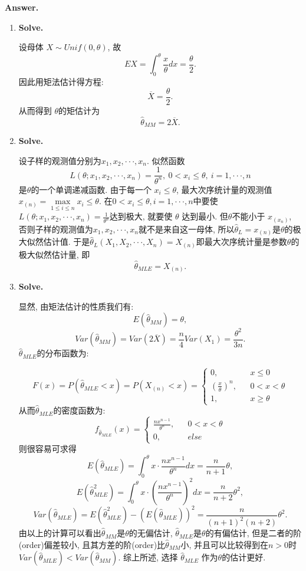 \documentclass[12pt, a4paper, oneside]{ctexart}
\newenvironment{solution}{\par\noindent \textbf {Answer. }}{\par}
\begin{document}
\begin{solution}	
   	\begin{enumerate}
   	\item {\tt}    {\bf Solve.} 
  
   设母体 $X  \sim Unif(0,\theta)$, 故
   \[ EX = \int_0^\theta \frac{x} {\theta}dx = \frac{\theta}{2} . \]
   因此用矩法估计得方程:\[ \overline{X}=\frac{\theta}{2} .\]
   从而得到 $\theta$的矩估计为\[ \hat{\theta}_{MM} = 2\overline{X}.\]
   	\item {\tt }   {\bf Solve.}
   
   	设子样的观测值分别为$x_1, x_2, · · · , x_n$. 似然函数\[ L(\theta;x_1, x_2,···,x_n) = \frac{1}{\theta ^ n}, \ 0 < x_i \le \theta ,\ i = 1,···,n\]是$\theta$的一个单调递减函数. 由于每一个 $x_i \le \theta$, 最大次序统计量的观测值$x_{(n)}=\underset{1\le i\le n}{\max}x_i \le \theta$. 在$0<x_i\le \theta , i = 1,···,n$中要使 $L(\theta;x_1, x_2,···,x_n)= \frac{1}{\theta ^ n}$达到极大, 就要使 $\theta$ 达到最小. 但$\theta$不能小于 $x_{(x_n)}$, 否则子样的观测值为$x_1, x_2, · · · , x_n$就不是来自这一母体, 所以$\hat{\theta}_L = x_{(n)}$是$\theta$的极大似然估计值. 于是$\hat{\theta}_L(X_1,X_2,···,X_n) = X_{(n)}$即最大次序统计量是参数$\theta$的极大似然估计量, 即\[ \hat{\theta}_{MLE}= X_{(n)}.\]
   	
   	\item {\tt }   {\bf Solve.}
   
   	显然, 由矩法估计的性质我们有:
   	\[ E(\hat{\theta}_{MM}) = \theta ,\] \[ Var(\hat{\theta}_{MM}) = Var(2\overline X) = \frac n 4Var(X_1) = \frac{\theta^2}{3n}. \]
   	$\hat{\theta}_{MLE}$的分布函数为:
   	
   $$ F(x) = P(\hat{\theta}_{MLE} < x)=P(X_{(n)} < x)=\left\{
   \begin{array}{rcl}
    0, & & {x \le 0}\\
   (\frac x \theta )^n, & & {0<x<\theta}\\
   1, & & {x\ge \theta}
   \end{array} \right. $$
   从而$\hat{\theta}_{MLE}$的密度函数为:
  $$ f_{\hat{\theta}_{MLE}}(x) =\left\{
  \begin{array}{rcl}
  \frac{nx^{n-1}}{\theta^n}, & & {0<x<\theta}\\
  0, & & {else}
  \end{array} \right. $$
   则很容易可求得\[ E(\hat{\theta}_{MLE}) = \int_0^\theta x·\frac{nx^{n-1}}{\theta^n} dx = \frac{n}{n+1}\theta ,\]
   \[ E(\hat{\theta}_{MLE}^2) = \int_0^\theta x·\left(\frac{nx^{n-1}}{\theta^n}\right)^2 dx = \frac{n}{n+2}\theta^2,\]
   \[ Var(\hat{\theta}_{MLE}) =   E(\hat{\theta}_{MLE}^2) - \left(E(\hat{\theta}_{MLE}) \right)^2 = \frac{n}{(n+1)^2(n+2)}\theta^2.\]
   由以上的计算可以看出$\hat{\theta}_{MM}$是$\theta$的无偏估计, $\hat{\theta}_{MLE}$是$\theta$的有偏估计, 但是二者的阶(order)偏差较小, 且其方差的阶(order)比$\hat{\theta}_{MM}$小, 并且可以比较得到在$n>0$时$Var(\hat{\theta}_{MLE})<Var(\hat{\theta}_{MM})$. 综上所述, 选择 $\hat{\theta}_{MLE}$ 作为$\theta$的估计更好.
   \end{enumerate} 
\end{solution}
\end{document}
